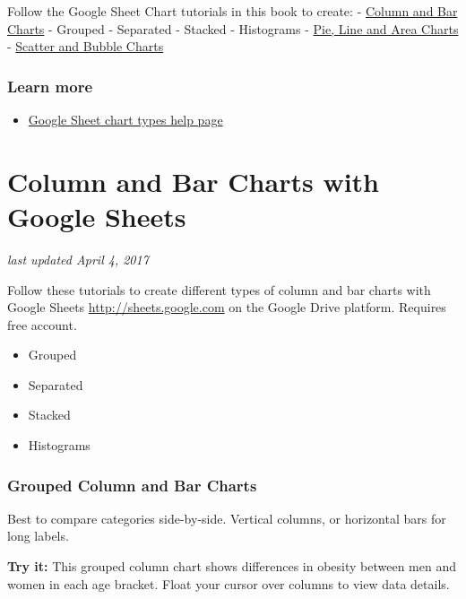 \documentclass[
  english,
]{book}
\providecommand{\tightlist}{%
  \setlength{\itemsep}{0pt}\setlength{\parskip}{0pt}}
\begin{document}
Follow the Google Sheet Chart tutorials in this book to create:
- \href{column-bar-google}{Column and Bar Charts}
- Grouped
- Separated
- Stacked
- Histograms
- \href{pie-line-area-google}{Pie, Line and Area Charts}
- \href{scatter-bubble-google}{Scatter and Bubble Charts}

\hypertarget{learn-more-6}{%
\subsubsection*{Learn more}\label{learn-more-6}}

\begin{itemize}
\tightlist
\item
  \href{https://support.google.com/docs/answer/190718}{Google Sheet chart types help page}
\end{itemize}

\hypertarget{column-bar-google}{%
\section{Column and Bar Charts with Google Sheets}\label{column-bar-google}}

\emph{last updated April 4, 2017}

Follow these tutorials to create different types of column and bar charts with Google Sheets \url{http://sheets.google.com} on the Google Drive platform. Requires free account.

\begin{itemize}
\tightlist
\item
  Grouped
\item
  Separated
\item
  Stacked
\item
  Histograms
\end{itemize}

\hypertarget{grouped-column-and-bar-charts}{%
\subsubsection*{Grouped Column and Bar Charts}\label{grouped-column-and-bar-charts}}

Best to compare categories side-by-side. Vertical columns, or horizontal bars for long labels.

\textbf{Try it:} This grouped column chart shows differences in obesity between men and women in each age bracket. Float your cursor over columns to view data details.
\end{document}
